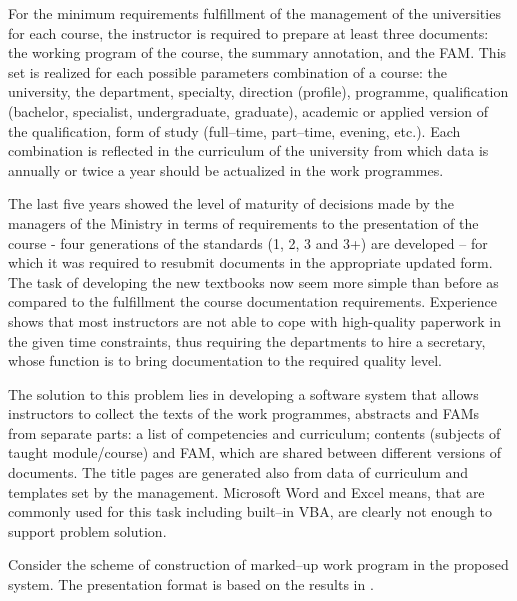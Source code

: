 \documentclass[12pt]{llncs}
\begin{document}
For the minimum requirements fulfillment of the management of the
universities for each course, the instructor is required to prepare at
least three documents: the working program of the course, the summary
annotation, and the FAM. This set is realized for each possible
parameters combination of a course: the university, the department,
specialty, direction (profile), programme, qualification (bachelor,
specialist, undergraduate, graduate), academic or applied version of the
qualification, form of study (full--time, part--time, evening, etc.). Each
combination is reflected in the curriculum of the university from which
data is annually or twice a year should be actualized in the work
programmes.

The last five years showed the level of maturity of decisions made by
the managers of the Ministry in terms of requirements to the
presentation of the course - four generations of the standards (1, 2, 3
and 3+) are developed -- for which it was required to resubmit documents
in the appropriate updated form. The task of developing the new
textbooks now seem more simple than before as compared to the
fulfillment the course documentation requirements. Experience shows that
most instructors are not able to cope with high-quality paperwork in the
given time constraints, thus requiring the departments to hire a
secretary, whose function is to bring documentation to the required
quality level.

The solution to this problem lies in developing a software system that
allows instructors to collect the texts of the work programmes,
abstracts and FAMs from separate parts: a list of competencies and
curriculum; contents (subjects of taught module/course) and FAM, which
are shared between different versions of documents. The title pages are
generated also from data of curriculum and templates set by the
management. Microsoft Word and Excel means, that are commonly used for
this task including built--in VBA, are clearly not enough to support
problem solution.

Consider the scheme of construction of marked--up work program in the
proposed system. The presentation format is based on the results in
\cite{b4,b15}.
\end{document}
